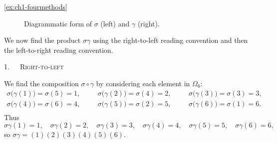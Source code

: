 \begin{solution}{\ref{ex:ch1-fourmethods}}
{\begin{figure}[h]
        \caption{Diagrammatic form of \(\sigma\) (left) and \(\gamma\) (right).}
        \label{fig:diagrammaticformexercises}
    \end{figure}

    We now find the product \(\sigma\gamma\) using the right-to-left reading convention and then the left-to-right reading convention.

    \textsc{1.~~~Right-to-left}

     We find the composition \(\sigma\circ\gamma\) by considering each element in \(\Omega_{6}\):
    \[
    \begin{array}{ccc}
        \sigma\big(\gamma(1)\big) = \sigma(5) = 1, \hspace{20pt} & \sigma\big(\gamma(2)\big) = \sigma(4) = 2, \hspace{20pt} & \sigma\big(\gamma(3)\big) = \sigma(3) = 3, \\[8pt]
        \sigma\big(\gamma(4)\big) = \sigma(6) = 4, \hspace{20pt} & \sigma\big(\gamma(5)\big) = \sigma(2) = 5, \hspace{20pt} & \sigma\big(\gamma(6)\big) = \sigma(1) = 6. \\
    \end{array}
    \]
    Thus
    \[
    \sigma\gamma(1) = 1,\quad \sigma\gamma(2) = 2,\quad \sigma\gamma(3) = 3,\quad \sigma\gamma(4) = 4,\quad \sigma\gamma(5) = 5,\quad \sigma\gamma(6) = 6,
    \]
    so \(\sigma\gamma = (1)(2)(3)(4)(5)(6)\).

}
\end{solution}
